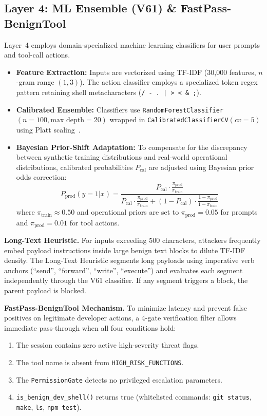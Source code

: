 \documentclass[conference]{IEEEtran}
\begin{document}
\subsection{Layer 4: ML Ensemble (V61) \& FastPass-BenignTool}
Layer~4 employs domain-specialized machine learning classifiers for user prompts and tool-call actions.
\begin{itemize}[leftmargin=*]
    \item \textbf{Feature Extraction:} Inputs are vectorized using TF-IDF (30,000 features, $n$-gram range $(1, 3)$). The action classifier employs a specialized token regex pattern retaining shell metacharacters (\texttt{/\ -\ .\ |\ >\ <\ \&\ ;}).
    \item \textbf{Calibrated Ensemble:} Classifiers use \texttt{RandomForestClassifier}$(n=100, \text{max\_depth}=20)$ wrapped in \texttt{CalibratedClassifierCV}$(cv=5)$ using Platt scaling~\cite{platt1999probabilistic}.
    \item \textbf{Bayesian Prior-Shift Adaptation:} To compensate for the discrepancy between synthetic training distributions and real-world operational distributions, calibrated probabilities $P_{\text{cal}}$ are adjusted using Bayesian prior odds correction:
    \begin{equation}
    P_{\text{prod}}(y=1|x) = \frac{P_{\text{cal}} \cdot \frac{\pi_{\text{prod}}}{\pi_{\text{train}}}}{P_{\text{cal}} \cdot \frac{\pi_{\text{prod}}}{\pi_{\text{train}}} + (1 - P_{\text{cal}}) \cdot \frac{1 - \pi_{\text{prod}}}{1 - \pi_{\text{train}}}}
    \label{eq:bayesian_prior}
    \end{equation}
    where $\pi_{\text{train}} \approx 0.50$ and operational priors are set to $\pi_{\text{prod}} = 0.05$ for prompts and $\pi_{\text{prod}} = 0.01$ for tool actions.
\end{itemize}

\textbf{Long-Text Heuristic.} For inputs exceeding 500 characters, attackers frequently embed payload instructions inside large benign text blocks to dilute TF-IDF density. The Long-Text Heuristic segments long payloads using imperative verb anchors (``send'', ``forward'', ``write'', ``execute'') and evaluates each segment independently through the V61 classifier. If any segment triggers a block, the parent payload is blocked.

\textbf{FastPass-BenignTool Mechanism.} To minimize latency and prevent false positives on legitimate developer actions, a 4-gate verification filter allows immediate pass-through when all four conditions hold:
\begin{enumerate}[leftmargin=*]
    \item The session contains zero active high-severity threat flags.
    \item The tool name is absent from \texttt{HIGH\_RISK\_FUNCTIONS}.
    \item The \texttt{PermissionGate} detects no privileged escalation parameters.
    \item \texttt{is\_benign\_dev\_shell()} returns true (whitelisted commands: \texttt{git status}, \texttt{make}, \texttt{ls}, \texttt{npm test}).
\end{enumerate}
\end{document}
